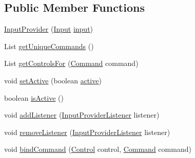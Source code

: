 \subsection*{Public Member Functions}
\begin{DoxyCompactItemize}
\item 
\mbox{\hyperlink{classorg_1_1newdawn_1_1slick_1_1command_1_1_input_provider_a7a96bc94a4b7dcfc72bff1dbfbe243b7}{Input\+Provider}} (\mbox{\hyperlink{classorg_1_1newdawn_1_1slick_1_1_input}{Input}} \mbox{\hyperlink{classorg_1_1newdawn_1_1slick_1_1command_1_1_input_provider_a7a9d7954c539d61bd8623da41c199d74}{input}})
\item 
List \mbox{\hyperlink{classorg_1_1newdawn_1_1slick_1_1command_1_1_input_provider_a34d5aff64cb457846fb408caf1f05bf1}{get\+Unique\+Commands}} ()
\item 
List \mbox{\hyperlink{classorg_1_1newdawn_1_1slick_1_1command_1_1_input_provider_ab2b7def0bd26b6292ac45b4ca253e43a}{get\+Controls\+For}} (\mbox{\hyperlink{interfaceorg_1_1newdawn_1_1slick_1_1command_1_1_command}{Command}} command)
\item 
void \mbox{\hyperlink{classorg_1_1newdawn_1_1slick_1_1command_1_1_input_provider_a4ff61ae89a9b3fc0ac8bcf95adc38a01}{set\+Active}} (boolean \mbox{\hyperlink{classorg_1_1newdawn_1_1slick_1_1command_1_1_input_provider_ad390b811fb89db3fde054cc1ecae20b0}{active}})
\item 
boolean \mbox{\hyperlink{classorg_1_1newdawn_1_1slick_1_1command_1_1_input_provider_a13cd156adf59ef712b9ebb4c0c21f2b8}{is\+Active}} ()
\item 
void \mbox{\hyperlink{classorg_1_1newdawn_1_1slick_1_1command_1_1_input_provider_a1170cd03e9cb6062346408e77ddc686e}{add\+Listener}} (\mbox{\hyperlink{interfaceorg_1_1newdawn_1_1slick_1_1command_1_1_input_provider_listener}{Input\+Provider\+Listener}} listener)
\item 
void \mbox{\hyperlink{classorg_1_1newdawn_1_1slick_1_1command_1_1_input_provider_ae6178aceb952f89deca034a74a2fd160}{remove\+Listener}} (\mbox{\hyperlink{interfaceorg_1_1newdawn_1_1slick_1_1command_1_1_input_provider_listener}{Input\+Provider\+Listener}} listener)
\item 
void \mbox{\hyperlink{classorg_1_1newdawn_1_1slick_1_1command_1_1_input_provider_a3d2308c3affc346525025891e91845fc}{bind\+Command}} (\mbox{\hyperlink{interfaceorg_1_1newdawn_1_1slick_1_1command_1_1_control}{Control}} control, \mbox{\hyperlink{interfaceorg_1_1newdawn_1_1slick_1_1command_1_1_command}{Command}} command)
\item 

\end{DoxyCompactItemize}
